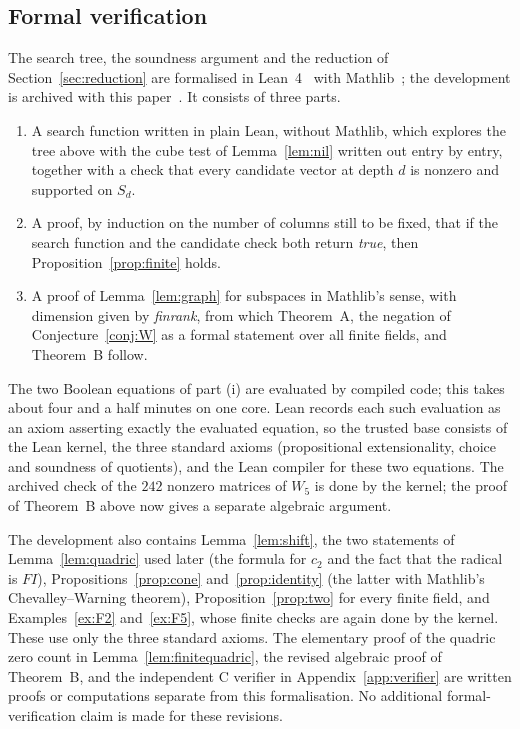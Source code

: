 \documentclass[screen]{aomart}
\theoremstyle{definition}
\theoremstyle{remark}
\numberwithin{equation}{section}
\begin{document}
\subsection{Formal verification}\label{sec:lean}
The search tree, the soundness argument and the reduction of Section~\ref{sec:reduction} are formalised in Lean~4~\cite{MU} with Mathlib~\cite{Mathlib}; the development is archived with this paper~\cite{Ar}. It consists of three parts.
\begin{enumerate}[label=(\roman*),leftmargin=*]
\item A search function written in plain Lean, without Mathlib, which explores the tree above with the cube test of Lemma~\ref{lem:nil} written out entry by entry, together with a check that every candidate vector at depth $d$ is nonzero and supported on $S_d$.
\item A proof, by induction on the number of columns still to be fixed, that if the search function and the candidate check both return \emph{true}, then Proposition~\ref{prop:finite} holds.
\item A proof of Lemma~\ref{lem:graph} for subspaces in Mathlib's sense, with dimension given by \emph{finrank}, from which Theorem~A, the negation of Conjecture~\ref{conj:W} as a formal statement over all finite fields, and Theorem~B follow.
\end{enumerate}
The two Boolean equations of part (i) are evaluated by compiled code; this takes about four and a half minutes on one core. Lean records each such evaluation as an axiom asserting exactly the evaluated equation, so the trusted base consists of the Lean kernel, the three standard axioms (propositional extensionality, choice and soundness of quotients), and the Lean compiler for these two equations. The archived check of the $242$ nonzero matrices of $W_5$ is done by the kernel; the proof of Theorem~B above now gives a separate algebraic argument.

The development also contains Lemma~\ref{lem:shift}, the two statements of Lemma~\ref{lem:quadric} used later (the formula for $c_2$ and the fact that the radical is $FI$), Propositions~\ref{prop:cone} and~\ref{prop:identity} (the latter with Mathlib's Chevalley--Warning theorem), Proposition~\ref{prop:two} for every finite field, and Examples~\ref{ex:F2} and~\ref{ex:F5}, whose finite checks are again done by the kernel. These use only the three standard axioms. The elementary proof of the quadric zero count in Lemma~\ref{lem:finitequadric}, the revised algebraic proof of Theorem~B, and the independent C verifier in Appendix~\ref{app:verifier} are written proofs or computations separate from this formalisation. No additional formal-verification claim is made for these revisions.
\end{document}
